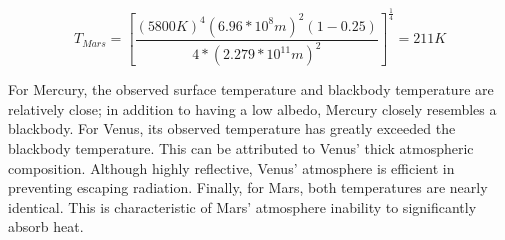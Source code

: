 \documentclass{homework}
\begin{document}
\begin{equation*}
    T_{Mars} =\left[ \frac{(5800K)^4(6.96*10^8 m)^2 (1-0.25)}{4*(2.279*10^{11} m)^2}         
    \right]^\frac{1}{4} = 211 K
\end{equation*}

For Mercury, the observed surface temperature and blackbody temperature are relatively close; in addition to having a low albedo, Mercury closely resembles a blackbody. For Venus, its observed temperature has greatly exceeded the blackbody temperature. This can be attributed to Venus' thick atmospheric composition. Although highly reflective, Venus' atmosphere is efficient in preventing escaping radiation. Finally, for Mars, both temperatures are nearly identical. This is characteristic of Mars' atmosphere inability to significantly absorb heat.
\end{document}
